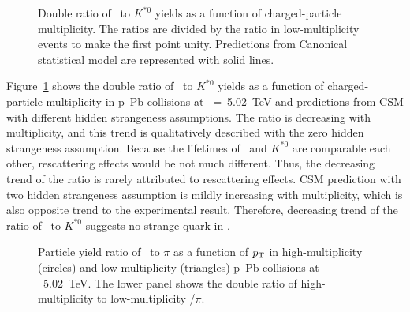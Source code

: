 \begin{figure}[!hbt]
	\centering
	\caption{ Double ratio of \fzero~to $K^{*0}$ yields as a function of charged-particle multiplicity. The ratios are divided by the ratio in low-multiplicity events to make the first point unity. Predictions from Canonical statistical model are represented with solid lines. }
	\label{fig:f0KSAddCSM}
\end{figure}

Figure~\ref{fig:f0KSAddCSM} shows the double ratio of \fzero~to $K^{*0}$ yields as a function of charged-particle multiplicity in p--Pb collisions at \snn~=~5.02~TeV and predictions from CSM with different hidden strangeness assumptions. The ratio is decreasing with multiplicity, and this trend is qualitatively described with the zero hidden strangeness assumption. Because the lifetimes of \fzero~and $K^{*0}$ are comparable each other, rescattering effects would be not much different. Thus, the decreasing trend of the ratio is rarely attributed to rescattering effects. CSM prediction with two hidden strangeness assumption is mildly increasing with multiplicity, which is also opposite trend to the experimental result. Therefore, decreasing trend of the ratio of \fzero~to $K^{*0}$ suggests no strange quark in \fzero.

\begin{figure}[!hbt]
	\centering
	\caption{ Particle yield ratio of \fzero~to $\pi$ as a function of $p_{\rm{T}}$ in high-multiplicity (circles) and low-multiplicity (triangles) p--Pb collisions at \snn~5.02~TeV. The lower panel shows the double ratio of high-multiplicity to low-multiplicity \fzero/$\pi$. }
	\label{fig:f0piPt}
\end{figure}

